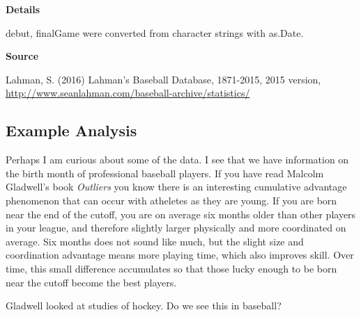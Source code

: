 \documentclass[]{book}
\newenvironment{Shaded}{\begin{snugshade}}{\end{snugshade}}
\newcommand{\DataTypeTok}[1]{\textcolor[rgb]{0.13,0.29,0.53}{#1}}
\newcommand{\DecValTok}[1]{\textcolor[rgb]{0.00,0.00,0.81}{#1}}
\newcommand{\KeywordTok}[1]{\textcolor[rgb]{0.13,0.29,0.53}{\textbf{#1}}}
\newcommand{\NormalTok}[1]{#1}
\newcommand{\OperatorTok}[1]{\textcolor[rgb]{0.81,0.36,0.00}{\textbf{#1}}}
\newcommand{\StringTok}[1]{\textcolor[rgb]{0.31,0.60,0.02}{#1}}
\theoremstyle{definition}
\theoremstyle{definition}
\theoremstyle{definition}
\theoremstyle{remark}
\begin{document}
\textbf{Details}

debut, finalGame were converted from character strings with as.Date.

\textbf{Source}

Lahman, S. (2016) Lahman's Baseball Database, 1871-2015, 2015 version,
\url{http://www.seanlahman.com/baseball-archive/statistics/}

\hypertarget{example-analysis}{%
\subsection{Example Analysis}\label{example-analysis}}

Perhaps I am curious about some of the data. I see that we have
information on the birth month of professional baseball players. If you
have read Malcolm Gladwell's book \emph{Outliers} you know there is an
interesting cumulative advantage phenomenon that can occur with
atheletes as they are young. If you are born near the end of the cutoff,
you are on average six months older than other players in your league,
and therefore slightly larger physically and more coordinated on
average. Six months does not sound like much, but the slight size and
coordination advantage means more playing time, which also improves
skill. Over time, this small difference accumulates so that those lucky
enough to be born near the cutoff become the best players.

Gladwell looked at studies of hockey. Do we see this in baseball?

\begin{Shaded}
\end{Shaded}
\end{document}
